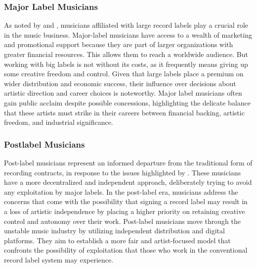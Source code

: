 \subsubsection{Major Label Musicians}
As noted by \textcite{arditi21} and \textcite{martinez21}, musicians affiliated with large record labels play a crucial role in the music business. Major-label musicians have access to a wealth of marketing and promotional support because they are part of larger organizations with greater financial resources. This allows them to reach a worldwide audience. But working with big labels is not without its costs, as it frequently means giving up some creative freedom and control. Given that large labels place a premium on wider distribution and economic success, their influence over decisions about artistic direction and career choices is noteworthy. Major label musicians often gain public acclaim despite possible concessions, highlighting the delicate balance that these artists must strike in their careers between financial backing, artistic freedom, and industrial significance. \pagebreak

\subsubsection{Postlabel Musicians}
Post-label musicians represent an informed departure from the traditional form of recording contracts, in response to the issues highlighted by \textcite{arditi21}. These musicians have a more decentralized and independent approach, deliberately trying to avoid any exploitation by major labels. In the post-label era, musicians address the concerns that come with the possibility that signing a record label may result in a loss of artistic independence by placing a higher priority on retaining creative control and autonomy over their work. Post-label musicians move through the unstable music industry by utilizing independent distribution and digital platforms. They aim to establish a more fair and artist-focused model that confronts the possibility of exploitation that those who work in the conventional record label system may experience.

